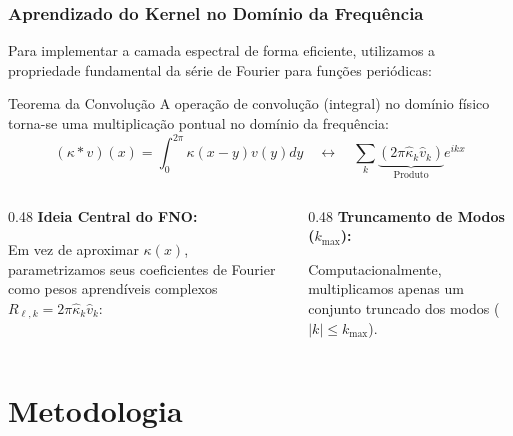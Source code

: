 \documentclass[usenames,dvipsnames,brazil,aspectratio=169]{beamer}
\begin{document}
\begin{frame}[t]
    \frametitle{Aprendizado do Kernel no Domínio da Frequência}
    
    Para implementar a camada espectral de forma eficiente, utilizamos a propriedade fundamental da série de Fourier para funções periódicas:
    
    \begin{block}{Teorema da Convolução}
        A operação de convolução (integral) no domínio físico torna-se uma multiplicação pontual no domínio da frequência:
        $$ (\kappa * v)(x) = \int_{0}^{2\pi} \kappa(x-y) v(y) dy \quad \longleftrightarrow \quad \sum_{k} \underbrace{(2\pi \hat{\kappa}_k \hat{v}_k)}_{\text{Produto}} e^{ikx} $$
    \end{block}
    
    \vspace{0.2cm}

    \begin{columns}[T]
        \begin{column}{0.48\textwidth}
            \textbf{Ideia Central do FNO:}
            \vspace{0.1cm}
            
            Em vez de aproximar $\kappa(x)$, parametrizamos seus coeficientes de Fourier como pesos aprendíveis complexos $R_{\ell,k} = 2\pi \hat{\kappa}_k \hat{v}_k$:
        \end{column}
        
        \begin{column}{0.48\textwidth}
            \textbf{Truncamento de Modos ($k_{\max}$):}
            \vspace{0.1cm}
            
            Computacionalmente, multiplicamos apenas um conjunto truncado dos modos ($|k| \le k_{\max}$).
        \end{column}
    \end{columns}
\end{frame}

\section{Metodologia}
\end{document}
